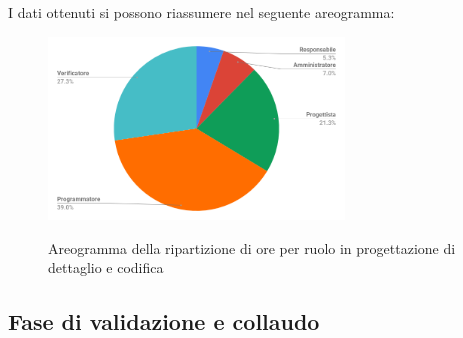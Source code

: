 \pagebreak
I dati ottenuti si possono riassumere nel seguente areogramma:
\begin{figure}[H] 
			\centering 
				\includegraphics[width=0.7\textwidth]{res/images/areogramma_dettaglio.png}\\
				\caption{Areogramma della ripartizione di ore per ruolo in progettazione di dettaglio e codifica}
			\label{AreogrammaDettaglio}
\end{figure}


\subsection{Fase di validazione e collaudo}
